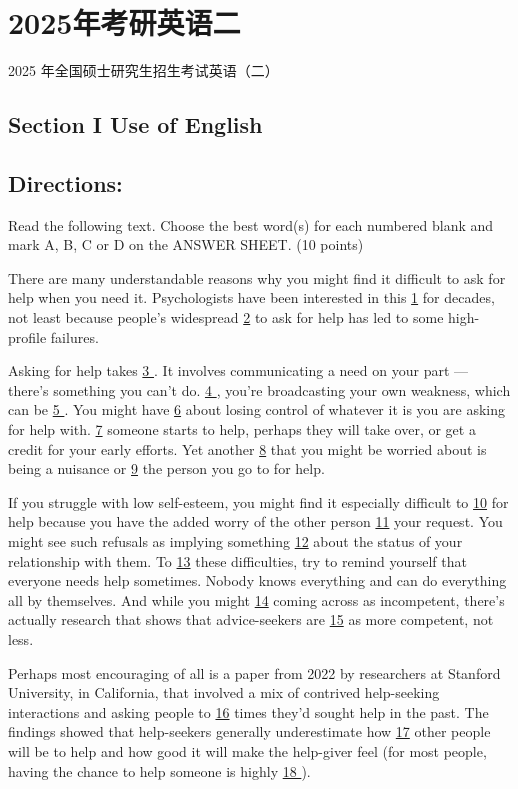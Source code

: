 \documentclass[UTF8,11pt]{ctexart}
\begin{document}
\section*{2025年考研英语二}
2025 年全国硕士研究生招生考试英语（二）


\subsection*{\textbf{Section I Use of English}}


\subsection*{\textbf{Directions:}}


Read the following text. Choose the best word(s) for each numbered blank and mark A, B, C or D on the ANSWER SHEET. (10 points)


There are many understandable reasons why you might find it difficult to ask for help when you need it. Psychologists have been interested in this \uline{1} for decades, not least because people’s widespread \uline{2} to ask for help has led to some high-profile failures.


Asking for help takes \uline{3 }. It involves communicating a need on your part — there’s something you can’t do. \uline{4 }, you’re broadcasting your own weakness, which can be \uline{5 }. You might have \uline{6} about losing control of whatever it is you are asking for help with. \uline{7} someone starts to help, perhaps they will take over, or get a credit for your early efforts. Yet another \uline{8} that you might be worried about is being a nuisance or \uline{9} the person you go to for help.


If you struggle with low self-esteem, you might find it especially difficult to \uline{10} for help because you have the added worry of the other person \uline{11} your request. You might see such refusals as implying something \uline{12} about the status of your relationship with them. To \uline{13} these difficulties, try to remind yourself that everyone needs help sometimes. Nobody knows everything and can do everything all by themselves. And while you might \uline{14} coming across as incompetent, there’s actually research that shows that advice-seekers are \uline{15} as more competent, not less.


Perhaps most encouraging of all is a paper from 2022 by researchers at Stanford University, in California, that involved a mix of contrived help-seeking interactions and asking people to \uline{16} times they’d sought help in the past. The findings showed that help-seekers generally underestimate how \uline{17} other people will be to help and how good it will make the help-giver feel (for most people, having the chance to help someone is highly \uline{18 }).
\end{document}
